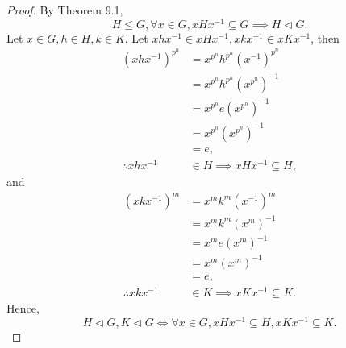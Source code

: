 \documentclass{article}
\theoremstyle{definition}
\begin{document}
\begin{proof}
      By Theorem 9.1,
      \begin{equation*}
          H \leq G, \forall x \in G, xHx^{-1} \subseteq G \implies H \lhd G.
      \end{equation*}
      Let $x\in G, h\in H, k\in K$. Let $xhx^{-1}\in xHx^{-1}, xkx^{-1}\in xKx^{-1}$, then
       \begin{align*}
           (xhx^{-1})^{p^n} &= x^{p^n}h^{p^n}(x^{-1})^{p^n} \\
           &=x^{p^n}h^{p^n}(x^{p^n})^{-1} \\
           &=  x^{p^n}e(x^{p^n})^{-1} \\
           &= x^{p^n}(x^{p^n})^{-1} \\
           &= e, \\
           \therefore xhx^{-1} &\in H \implies xHx^{-1} \subseteq H,
       \end{align*}
       and
       \begin{align*}
           (xkx^{-1})^m &= x^mk^m(x^{-1})^m \\
           &= x^mk^m(x^m)^{-1} \\
           &= x^me(x^m)^{-1} \\
           &= x^m(x^m)^{-1} \\
           &= e, \\
           \therefore xkx^{-1} &\in K \implies xKx^{-1} \subseteq K.
       \end{align*}
       Hence,
       \begin{equation*}
           H\lhd G, K\lhd G \iff \forall x\in G, xHx^{-1} \subseteq H, xKx^{-1} \subseteq K.
       \end{equation*}
       

\end{proof}
\end{document}
